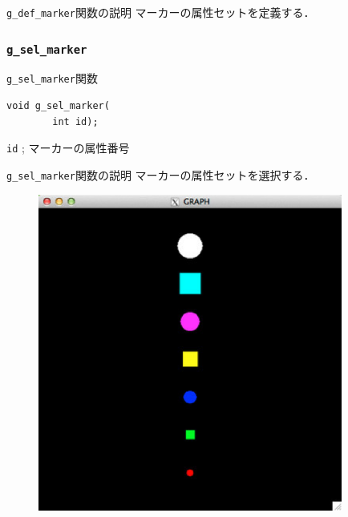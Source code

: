\documentclass[platex,a4paper,12pt]{jsarticle}%
\begin{document}
\begin{itembox}[l]{\texttt{g\_def\_marker}関数の説明}
マーカーの属性セットを定義する．
\end{itembox}

\subsubsection{\texttt{g\_sel\_marker}}

\begin{itembox}[l]{\texttt{g\_sel\_marker}関数}
\begin{verbatim}
void g_sel_marker(
        int id);
\end{verbatim}
\verb|id| ; マーカーの属性番号
\end{itembox}

\begin{itembox}[l]{\texttt{g\_sel\_marker}関数の説明}
マーカーの属性セットを選択する．
\end{itembox}

\begin{figure}[htb]
\centering
\includegraphics[width=100mm]{Canvas_g_marker.eps}
\end{figure}
\end{document}
